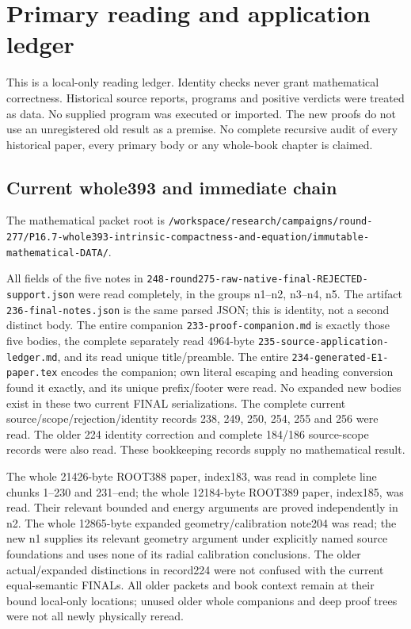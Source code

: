 \documentclass[11pt]{article}
\begin{document}
\section*{Primary reading and application ledger}

This is a local-only reading ledger. Identity checks never grant mathematical correctness. Historical source reports, programs and positive verdicts were treated as data. No supplied program was executed or imported. The new proofs do not use an unregistered old result as a premise. No complete recursive audit of every historical paper, every primary body or any whole-book chapter is claimed.

\subsection*{Current whole393 and immediate chain}

The mathematical packet root is \texttt{/workspace/research/campaigns/round-277/P16.7-whole393-intrinsic-compactness-and-equation/immutable-mathematical-DATA/}.

All fields of the five notes in \texttt{248-round275-raw-native-final-REJECTED-support.json} were read completely, in the groups n1--n2, n3--n4, n5. The artifact \texttt{236-final-notes.json} is the same parsed JSON; this is identity, not a second distinct body. The entire companion \texttt{233-proof-companion.md} is exactly those five bodies, the complete separately read 4964-byte \texttt{235-source-application-ledger.md}, and its read unique title/preamble. The entire \texttt{234-generated-E1-paper.tex} encodes the companion; own literal escaping and heading conversion found it exactly, and its unique prefix/footer were read. No expanded new bodies exist in these two current FINAL serializations. The complete current source/scope/rejection/identity records 238, 249, 250, 254, 255 and 256 were read. The older 224 identity correction and complete 184/186 source-scope records were also read. These bookkeeping records supply no mathematical result.

The whole 21426-byte ROOT388 paper, index183, was read in complete line chunks 1--230 and 231--end; the whole 12184-byte ROOT389 paper, index185, was read. Their relevant bounded and energy arguments are proved independently in n2. The whole 12865-byte expanded geometry/calibration note204 was read; the new n1 supplies its relevant geometry argument under explicitly named source foundations and uses none of its radial calibration conclusions. The older actual/expanded distinctions in record224 were not confused with the current equal-semantic FINALs. All older packets and book context remain at their bound local-only locations; unused older whole companions and deep proof trees were not all newly physically reread.
\end{document}
